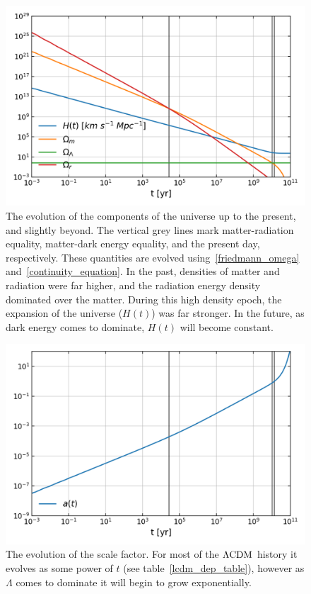 \begin{figure}[!pth]
\centering     %
    \includegraphics[width=.75\columnwidth]{plots/lcdm_components.png}
\caption{
    The evolution of the components of the universe up to the present, and slightly beyond.
    The vertical grey lines mark matter-radiation equality, matter-dark energy equality,
    and the present day, respectively.
    These quantities are evolved using~\eqref{friedmann_omega} and~\eqref{continuity_equation}.
    In the past, densities of matter and radiation were
    far higher, and the radiation energy density dominated over the matter.
    During this high density epoch, the expansion of the universe ($H(t)$) was far stronger.
    In the future, as dark energy comes to dominate, $H(t)$ will become constant.
}\label{fig:lcdm_components}
\end{figure}
\begin{figure}[!pth]
\centering     %
    \includegraphics[width=.75\columnwidth]{plots/lcdm_a.png}
\caption{
    The evolution of the scale factor. For most of the $\Lambda\text{CDM}$ history
    it evolves as some power of $t$ (see table~\ref{lcdm_dep_table}),
    however as $\Lambda$ comes to dominate
    it will begin to grow exponentially.
}\label{fig:lcdm_a}
\end{figure}

